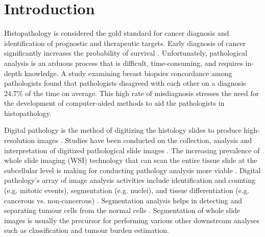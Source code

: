 \documentclass[times,twocolumn,final,authoryear]{tmp}
\begin{document}
\section{Introduction}
\label{path_sec:1}
{H}{istopathology} is considered the gold standard for cancer diagnosis \citep{gurcan2009histopathological,salamat2010robbins} and identification of prognostic and therapeutic targets. Early diagnosis of cancer significantly increases the probability of survival \citep{hawkes2019cancer}. Unfortunately, pathological analysis is an arduous process that is difficult, time-consuming, and requires in-depth knowledge. A study \citep{elmore2015diagnostic} examining breast biopsies concordance among pathologists found that pathologists disagreed with each other on a diagnosis 24.7\% of the time on average. This high rate of misdiagnosis stresses the need for the development of computer-aided methods to aid the pathologists in histopathology.

Digital pathology is the method of digitizing the histology slides to produce high-resolution images \citep{janowczyk2016deep}. Studies have been conducted on the collection, analysis and interpretation of digitized pathological slide images \citep{gurcan2009histopathological}. The increasing prevalence of whole slide imaging (WSI) technology that can scan the entire tissue slide at the subcellular level is making for conducting pathology analysis more viable \citep{madabhushi2016image}. Digital pathology's array of image analysis activities include identification and counting (e.g. mitotic events), segmentation (e.g. nuclei), and tissue differentiation (e.g. cancerous vs. non-cancerous) \citep{janowczyk2016deep,nanthagopal2013classification,guray2006benign}. Segmentation analysis helps in detecting and separating tumour cells from the normal cells \citep{wahlby2004combining,xu2016deep}. Segmentation of whole slide images is usually the precursor for performing various other downstream analyses such as classification and tumour burden estimation.
\end{document}
